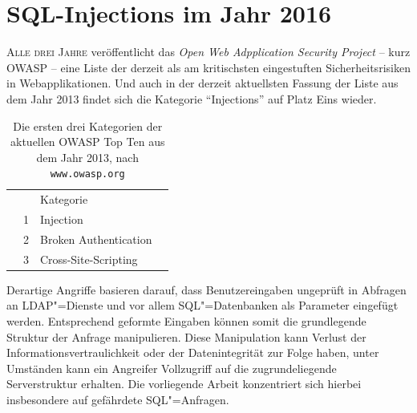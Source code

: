 







\tableofcontents

















\chapter{SQL-Injections im Jahr 2016}

\lettrine[lines=2]{A}{lle drei Jahre }veröffentlicht das \emph{Open Web Adpplication Security Project} -- kurz OWASP -- eine Liste der derzeit als am kritischsten eingestuften Sicherheitsrisiken in Webapplikationen. Und auch in der derzeit aktuellsten Fassung der Liste aus dem Jahr 2013 findet sich die Kategorie \enquote{Injections} auf Platz Eins wieder.

\begin{table}[ht!]
\begin{margincap}
\caption{Die ersten drei Kategorien der aktuellen OWASP Top Ten aus dem Jahr 2013, nach \texttt{www.owasp.org}}
\label{tab:owasp_top_ten}
\centering
\begin{tabu} to 
	& & Kategorie & \\
	& 1 & Injection & \\
	& 2 & Broken Authentication & \\
	& 3 & Cross-Site-Scripting & \\
\end{tabu}
\end{margincap}
\end{table}

Derartige Angriffe basieren darauf, dass Benutzereingaben ungeprüft in Abfragen an LDAP"=Dienste und vor allem SQL"=Datenbanken als Parameter eingefügt werden. Entsprechend geformte Eingaben können somit die grundlegende Struktur der Anfrage manipulieren. Diese Manipulation kann Verlust der Informationsvertraulichkeit oder der Datenintegrität zur Folge haben, unter Umständen kann ein Angreifer Vollzugriff auf die zugrundeliegende Serverstruktur erhalten. Die vorliegende Arbeit konzentriert sich hierbei insbesondere auf gefährdete SQL"=Anfragen.

